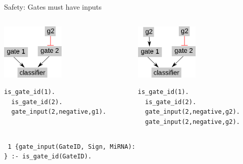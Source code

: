 \documentclass[10pt,dvipsnames]{beamer}
\begin{document}
\begin{frame}[fragile]{Safety: Gates must have inputs}
 \begin{columns}  
 \begin{column}{0.5\textwidth}
 \begin{center}\includegraphics[width=3cm]{constraints_01.png}\end{center}
 \color{my_example_color}
 \begin{Verbatim}[fontsize=\small]
  is_gate_id(1).
  is_gate_id(2).
  gate_input(2,negative,g1).
 \end{Verbatim}
 \end{column}
 \begin{column}{0.5\textwidth}
 \begin{center}\includegraphics[width=3cm]{constraints_02.png}\end{center}
 \color{my_example_color}
 \begin{Verbatim}[fontsize=\small]
  is_gate_id(1).
  is_gate_id(2).
  gate_input(2,negative,g2).
  gate_input(2,negative,g2).
 \end{Verbatim}
 \end{column}
 \end{columns}
 \vspace{1cm}
 \texttt{
 1 \{gate\_input(GateID, Sign, MiRNA):\\
  \} :- is\_gate\_id(GateID).
 }
 
\end{frame}
\end{document}
